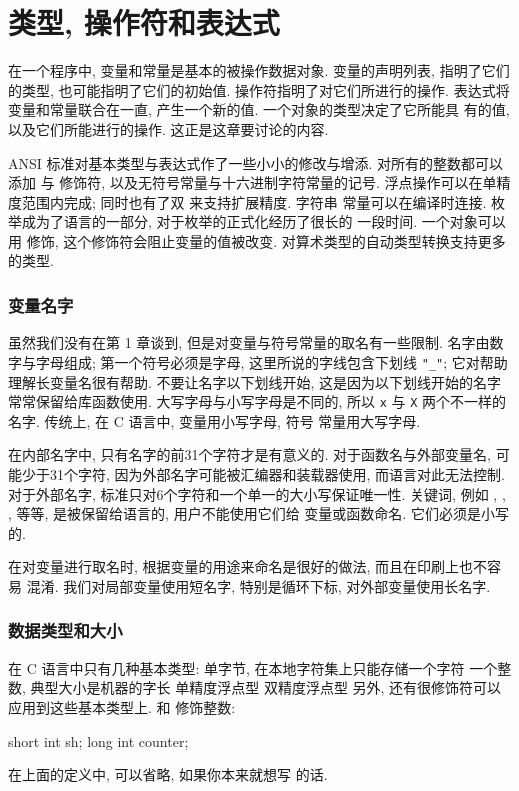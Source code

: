 
\chapter{类型, 操作符和表达式}\label{chap_toe}
在一个程序中, 变量和常量是基本的被操作数据对象. 变量的声明列表,
指明了它们的类型, 也可能指明了它们的初始值. 操作符指明了对它们所进行的操作.
表达式将变量和常量联合在一直, 产生一个新的值. 一个对象的类型决定了它所能具
有的值, 以及它们所能进行的操作. 这正是这章要讨论的内容.

ANSI 标准对基本类型与表达式作了一些小小的修改与增添. 对所有的整数都可以添加
\csigned 与 \cunsigned 修饰符, 以及无符号常量与十六进制字符常量的记号.
浮点操作可以在单精度范围内完成; 同时也有了双 \clong 来支持扩展精度. 字符串
常量可以在编译时连接. 枚举成为了语言的一部分, 对于枚举的正式化经历了很长的
一段时间. 一个对象可以用 \cconst 修饰, 这个修饰符会阻止变量的值被改变.
对算术类型的自动类型转换支持更多的类型.

\subsection{变量名字}
虽然我们没有在第 1 章谈到, 但是对变量与符号常量的取名有一些限制. 名字由数
字与字母组成; 第一个符号必须是字母, 这里所说的字线包含下划线 \verb'"_"';
它对帮助
理解长变量名很有帮助. 不要让名字以下划线开始, 这是因为以下划线开始的名字
常常保留给库函数使用. 大写字母与小写字母是不同的, 所以 \texttt{x} 与 
\texttt{X} 两个不一样的名字. 传统上, 在 C 语言中, 变量用小写字母, 符号
常量用大写字母.

在内部名字中, 只有名字的前31个字符才是有意义的. 对于函数名与外部变量名,
可能少于31个字符, 因为外部名字可能被汇编器和装载器使用, 而语言对此无法控制.
对于外部名字, 标准只对6个字符和一个单一的大小写保证唯一性. 关键词, 例如
\cif, \celse, \cint, \cfloat 等等, 是被保留给语言的, 用户不能使用它们给
变量或函数命名. 它们必须是小写的.

在对变量进行取名时, 根据变量的用途来命名是很好的做法, 而且在印刷上也不容易
混淆. 我们对局部变量使用短名字, 特别是循环下标, 对外部变量使用长名字.

\subsection{数据类型和大小}
在 C 语言中只有几种基本类型:
\cchar      单字节, 在本地字符集上只能存储一个字符
\cint       一个整数, 典型大小是机器的字长
\cfloat     单精度浮点型
\cdouble    双精度浮点型
另外, 还有很修饰符可以应用到这些基本类型上. \cshort 和 \clong 修饰整数:
\begin{myverbatim}
    short int   sh;
    long int    counter;
\end{myverbatim}
在上面的定义中, \cint 可以省略, 如果你本来就想写 \cint 的话.

